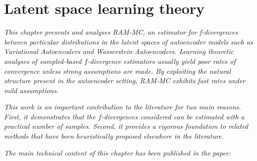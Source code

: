 \chapter{Latent space learning theory}\label{chapter:latent-space-learning-theory}

\ifpdf
    \graphicspath{{Chapter5/Figs/Raster/}{Chapter5/Figs/PDF/}{Chapter5/Figs/}}
\else
    \graphicspath{{Chapter5/Figs/Vector/}{Chapter5/Figs/}}
\fi

\emph{This chapter presents and analyses RAM-MC, an estimator for f-divergences between particular distributions in the latent spaces of autoencoder models such as Variational Autoencoders and Wasserstein Autoencoders. 
Learning theoretic analyses of sampled-based $f$-divergence estimators usually yield poor rates of convergence unless strong assumptions are made.
By exploiting the natural structure present in the autoencoder setting, RAM-MC exhibits fast rates under mild assumptions.}

\emph{This work is an important contribution to the literature for two main reasons. 
First, it demonstrates that the $f$-divergences considered can be estimated with a practical number of samples.
Second, it provides a rigorous foundation to related methods that have been heuristically proposed elsewhere in the literature.}

\emph{The main technical content of this chapter has been published in the paper:}

\begin{quote}
\end{quote}

%
%
%
%

